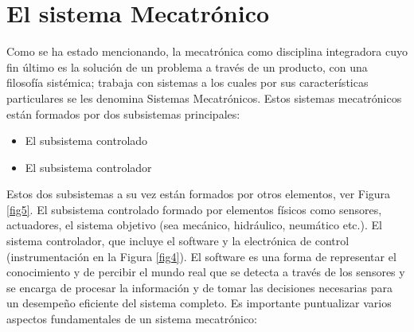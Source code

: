 \documentclass[12pt]{book}
\theoremstyle{definition}
\theoremstyle{remark}
\theoremstyle{plain}
\begin{document}
\section{El sistema Mecatrónico}

Como se ha estado mencionando, la mecatrónica como disciplina integradora cuyo fin último es la solución de un problema a través de un producto, con una filosofía sistémica; trabaja con sistemas a los cuales por sus características particulares se les denomina Sistemas Mecatrónicos. Estos sistemas mecatrónicos están formados por dos subsistemas principales:

\begin{itemize}
\item El subsistema controlado
\item El subsistema controlador
\end{itemize}

Estos dos subsistemas a su vez están formados por otros elementos, ver Figura \ref{fig5}. El subsistema controlado formado por elementos físicos como sensores, actuadores, el sistema objetivo (sea mecánico, hidráulico, neumático etc.). El sistema controlador, que incluye el software y la electrónica de control (instrumentación en la Figura \ref{fig4}). El software es una forma de representar el conocimiento y de percibir el mundo real que se detecta a través de los sensores y se encarga de procesar la información y de tomar las decisiones necesarias para un desempeño eficiente del sistema completo. Es importante puntualizar varios aspectos fundamentales de un sistema mecatrónico:
\end{document}
